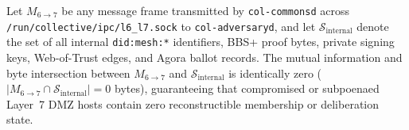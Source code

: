 \begin{invariant}
\label{inv:naacp-data-nonexistence}
Let $M_{6 \to 7}$ be any message frame transmitted by \texttt{col-commonsd} across \texttt{/run/collective/ipc/l6\_l7.sock} to \texttt{col-adversaryd}, and let $\mathcal{S}_{\mathrm{internal}}$ denote the set of all internal \texttt{did:mesh:*} identifiers, BBS+ proof bytes, private signing keys, Web-of-Trust edges, and Agora ballot records. The mutual information and byte intersection between $M_{6 \to 7}$ and $\mathcal{S}_{\mathrm{internal}}$ is identically zero ($|M_{6 \to 7} \cap \mathcal{S}_{\mathrm{internal}}| = 0$ bytes), guaranteeing that compromised or subpoenaed Layer~7 DMZ hosts contain zero reconstructible membership or deliberation state.
\end{invariant}


